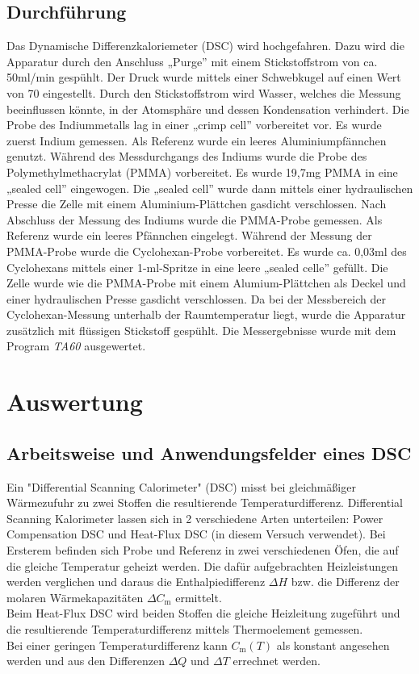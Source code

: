 \documentclass[a4paper,12pt,oneside,onecolum,final,openany]{report}
\begin{document}
\section{Durchführung}
Das Dynamische Differenzkaloriemeter (DSC) wird hochgefahren. Dazu wird die Apparatur durch den Anschluss „Purge” \;mit einem Stickstoffstrom von ca. 50\;ml/min gespühlt. Der Druck wurde mittels einer Schwebkugel auf einen Wert von 70 eingestellt. Durch den Stickstoffstrom wird Wasser, welches die Messung beeinflussen könnte, in der Atomsphäre und dessen Kondensation verhindert. Die Probe des Indiummetalls lag in einer „crimp cell” \;vorbereitet vor. Es wurde zuerst Indium gemessen. Als Referenz wurde ein leeres Aluminiumpfännchen genutzt. Während des Messdurchgangs des Indiums wurde die Probe des Polymethylmethacrylat (PMMA) vorbereitet. Es wurde 19,7\;mg PMMA in eine „sealed cell” \;eingewogen. Die „sealed cell” \;wurde dann mittels einer hydraulischen Presse die Zelle mit einem Aluminium-Plättchen gasdicht verschlossen. Nach Abschluss der Messung des Indiums wurde die PMMA-Probe gemessen. Als Referenz wurde ein leeres Pfännchen eingelegt. Während der Messung der PMMA-Probe wurde die Cyclohexan-Probe vorbereitet. Es wurde ca. 0,03\;ml des Cyclohexans mittels einer 1-ml-Spritze in eine leere „sealed celle” \;gefüllt. Die Zelle wurde wie die PMMA-Probe mit einem Alumium-Plättchen als Deckel und einer hydraulischen Presse gasdicht verschlossen. Da bei der Messbereich der Cyclohexan-Messung unterhalb der Raumtemperatur liegt, wurde die Apparatur zusätzlich mit flüssigen Stickstoff gespühlt. Die Messergebnisse wurde mit dem Program \textit{TA60} ausgewertet.  
\chapter{Auswertung}
\section{Arbeitsweise und Anwendungsfelder eines DSC}
Ein "Differential Scanning Calorimeter" (DSC) misst bei gleichmäßiger Wärmezufuhr zu zwei Stoffen die resultierende Temperaturdifferenz.
Differential Scanning Kalorimeter lassen sich in 2 verschiedene Arten unterteilen: Power Compensation DSC und Heat-Flux DSC (in diesem Versuch verwendet). Bei Ersterem befinden sich Probe und Referenz in zwei verschiedenen Öfen, die auf die gleiche Temperatur geheizt werden. Die dafür aufgebrachten Heizleistungen werden verglichen und daraus die Enthalpiedifferenz $\Delta H$ bzw. die Differenz der molaren Wärmekapazitäten $\Delta C_\mathrm{m}$ ermittelt.\\
Beim Heat-Flux DSC wird beiden Stoffen die gleiche Heizleitung zugeführt und die resultierende Temperaturdifferenz mittels Thermoelement gemessen.\\
Bei einer geringen Temperaturdifferenz kann $C_\mathrm{m}(T)$ als konstant angesehen werden und aus den Differenzen $\Delta Q$ und $\Delta T$ errechnet werden.
\end{document}
